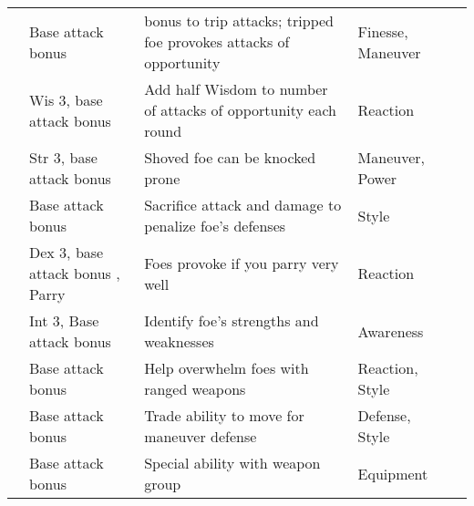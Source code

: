 {\begin{longtabu}{>{\lcol}p{10em} >{\lcol}p{15em} >{\lcol}X >{\lcol}p{6em} >{\lcol}p{3em}}
         & Base attack bonus  &  bonus to trip attacks; tripped foe provokes attacks of opportunity & Finesse, Maneuver &  \\
         & Wis 3, base attack bonus  & Add half Wisdom to number of attacks of opportunity each round & Reaction &  \\
         & Str 3, base attack bonus  & Shoved foe can be knocked prone & Maneuver, Power &  \\
         & Base attack bonus  & Sacrifice attack and damage to penalize foe's defenses & Style &  \\
         & Dex 3, base attack bonus , Parry & Foes provoke if you parry very well & Reaction &  \\
         & Int 3, Base attack bonus  & Identify foe's strengths and weaknesses & Awareness &  \\
         & Base attack bonus  & Help overwhelm foes with ranged weapons & Reaction, Style &  \\
         & Base attack bonus  & Trade ability to move for maneuver defense & Defense, Style &  \\
         & Base attack bonus  & Special ability with weapon group & Equipment &  \\


\end{longtabu}}
